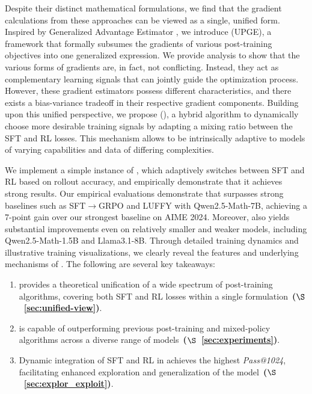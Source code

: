 Despite their distinct mathematical formulations, we find that the gradient calculations from these approaches can be viewed as a single, unified form. Inspired by Generalized Advantage Estimator \citep{schulman2015high}, we introduce \framework (UPGE), a framework that formally subsumes the gradients of various post-training objectives into one generalized expression. We provide analysis to show that the various forms of gradients are, in fact, not conflicting.
Instead, they act as complementary learning signals that can jointly guide the optimization process.
However, these gradient estimators possess different characteristics, and there exists a bias-variance tradeoff in their respective gradient components. 
Building upon this unified perspective, we propose \method (\mot), a hybrid algorithm to dynamically choose more desirable training signals by adapting a mixing ratio between the SFT and RL losses.
This mechanism allows \mot to be intrinsically adaptive to models of varying capabilities and data of differing complexities.

We implement a simple instance of \mot, which adaptively switches between SFT and RL based on rollout accuracy, and empirically demonstrate that it achieves strong results.
Our empirical evaluations demonstrate that \mot surpasses strong baselines such as SFT$\rightarrow$GRPO and LUFFY with Qwen2.5-Math-7B, achieving a 7-point gain over our strongest baseline on AIME 2024.
Moreover, \mot also yields substantial improvements even on relatively smaller and weaker models, including Qwen2.5-Math-1.5B and Llama3.1-8B.
Through detailed training dynamics and illustrative training visualizations, we clearly reveal the features and underlying mechanisms of \mot.
The following are several key takeaways:


\begin{tcolorbox}[takeawaysbox]
\begin{enumerate}[leftmargin=1em]
    \item \gpe provides a theoretical unification of a wide spectrum of post-training algorithms, covering both SFT and RL losses within a single formulation~\textbf{($\S$~\ref{sec:unified-view})}.
    \item \mot is capable of outperforming previous post-training and mixed-policy algorithms across a diverse range of models~\textbf{($\S$~\ref{sec:experiments})}.
    \item Dynamic integration of SFT and RL in \mot achieves the highest \emph{Pass@1024}, facilitating enhanced exploration and generalization of the model~\textbf{($\S$~\ref{sec:explor_exploit})}.
\end{enumerate}



\end{tcolorbox}









